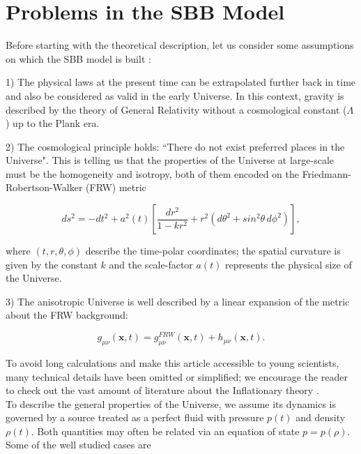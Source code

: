 \documentclass{rmaa}
\def\beq{\begin{equation}}
\def\eeq{\end{equation}}
\begin{document}
\section{Problems in the SBB Model}

Before starting with the theoretical description, let us consider some assumptions on which the
SBB model is built \citep{Coles}:

1) The physical laws at the present time can be extrapolated further back in time and also be
 considered as valid in the early Universe. In this context, gravity is described by
 the theory of General Relativity without a cosmological constant ($\Lambda$) up to the Plank era.  

 2) The cosmological principle holds: ``There do not exist preferred places in the Universe".
 This is telling us that the properties of the Universe at large-scale must be the homogeneity and isotropy,
both of them encoded on the Friedmann-Robertson-Walker (FRW) metric

\begin{equation}
 ds^2= -dt^2 + a^2(t)\left[ \frac{dr^2}{1-kr^2} +r^2 (d\theta^2 +sin^2\theta\, d\phi^2) \right],
\end{equation}

\noindent
where $(t,r,\theta,\phi)$ describe the time-polar coordinates; the spatial curvature is given by the 
constant $k$ and the scale-factor $a(t)$ represents the physical size of the Universe.
  
 3) The anisotropic Universe is well described by a linear expansion of the metric about the 
 FRW background:
 
\beq \label{eq:metric}
g_{\mu \nu}(\textbf{x},t)= g_{\mu \nu}^{FRW}(\textbf{x},t)+h_{\mu \nu}(\textbf{x},t).
\eeq

To avoid long calculations and make this article accessible to young scientists, many 
technical details have been omitted or simplified; 
we encourage the reader to check out the vast amount of literature about the Inflationary theory
 \citep{LiddleLyth, Liddle, Kolbbo, Dodelson, Lindeb}.
\\

To describe the general properties of the Universe, we assume its dynamics is governed by a source treated as a
perfect fluid with pressure $p(t)$ and density $\rho(t)$. Both quantities may often be related
via an equation of state $p=p(\rho)$. Some of the well studied cases are  
\end{document}
